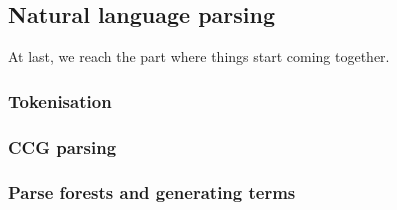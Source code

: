 \documentclass[main.tex]{subfiles}
\begin{document}
\subsection{Natural language parsing}
At last, we reach the part where things start coming together.
\subsubsection{Tokenisation}\label{sec:tokenisation}
\subsubsection{CCG parsing}
\subsubsection{Parse forests and generating terms}
\end{document}
